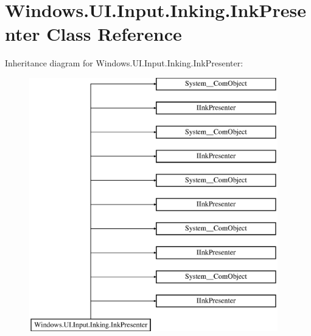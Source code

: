 \hypertarget{class_windows_1_1_u_i_1_1_input_1_1_inking_1_1_ink_presenter}{}\section{Windows.\+U\+I.\+Input.\+Inking.\+Ink\+Presenter Class Reference}
\label{class_windows_1_1_u_i_1_1_input_1_1_inking_1_1_ink_presenter}
Inheritance diagram for Windows.\+U\+I.\+Input.\+Inking.\+Ink\+Presenter\+:\begin{figure}[H]
\begin{center}
\leavevmode
\includegraphics[height=11.000000cm]{class_windows_1_1_u_i_1_1_input_1_1_inking_1_1_ink_presenter}
\end{center}
\end{figure}
